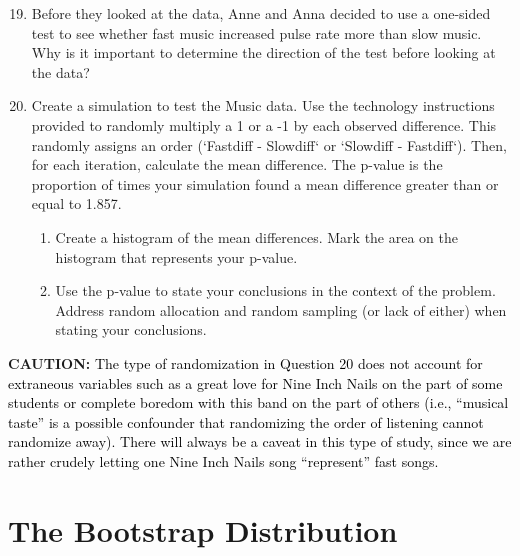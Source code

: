 \documentclass[
]{report}
\begin{document}
\begin{enumerate}
  \setcounter{enumi}{18}  

  \item Before they looked at the data, Anne and Anna decided to use a one-sided test to see whether fast
  music increased pulse rate more than slow music. Why is it important to determine the direction of the
  test before looking at the data?

  \item Create a simulation to test the Music data. Use the technology instructions provided to randomly
  multiply a 1 or a -1 by each observed difference. This randomly assigns an order (`Fastdiff -
  Slowdiff` or `Slowdiff - Fastdiff`). Then, for each iteration, calculate the mean difference. The
  p-value is the proportion of times your simulation found a mean difference greater than or equal to
  1.857.
  \begin{enumerate}
    \item Create a histogram of the mean differences. Mark the area on the histogram that represents your p-value.

    \item Use the p-value to state your conclusions in the context of the problem. Address random allocation
    and random sampling (or lack of either) when stating your conclusions.
  \end{enumerate}
\end{enumerate}

\large

\textbf{CAUTION:}
\textcolor{black}{The type of randomization in Question 20 does not account for extraneous variables such as a great love
for Nine Inch Nails on the part of some students or complete boredom with this band on the part of others
(i.e., “musical taste” is a possible confounder that randomizing the order of listening cannot randomize
away). There will always be a caveat in this type of study, since we are rather crudely letting one Nine
Inch Nails song “represent” fast songs.}

\section{\texorpdfstring{\textbf{The Bootstrap Distribution}}{The Bootstrap Distribution}}\label{the-bootstrap-distribution}

\normalsize
\end{document}
